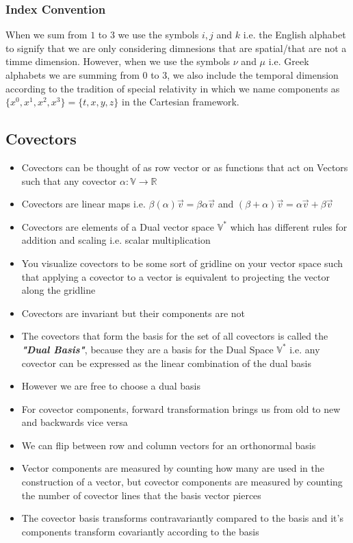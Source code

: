 \subsubsection{Index Convention}
When we sum from $1$ to $3$ we use the symbols $i,j$ and $k$ i.e. the English alphabet to signify that we are only considering dimnesions that are spatial/that are not a timme dimension. However, when we use the symbols $\nu$ and $\mu$ i.e. Greek alphabets we are summing from 0 to 3, we also include the temporal dimension according to the tradition of special relativity in which we name components as $\{x^{0}, x^{1}, x^{2}, x^{3}\} = \{t, x, y, z\}$ in the Cartesian framework.

\subsection{Covectors}
\begin{itemize}
	\item Covectors can be thought of as row vector or as functions that act on Vectors such that any covector $\alpha : \mathbb{V} \rightarrow \mathbb{R}$
	\item Covectors are linear maps i.e. $ \beta ( \alpha ) \vec{v} = \beta \alpha \vec{v}$ and $(\beta + \alpha ) \vec{v} = \alpha \vec{v} + \beta \vec{v}$
	\item Covectors are elements of a Dual vector space $\mathbb{V}^*$ which has different rules for addition and scaling i.e. scalar multiplication
	\item You visualize covectors to be some sort of gridline on your vector space such that applying a covector to a vector is equivalent to projecting the vector along the gridline
	\item Covectors are invariant but their components are not
	\item The covectors that form the basis for the set of all covectors is called the \textit{\textbf{"Dual Basis"}}, because they are a basis for the Dual Space $\mathbb{V}^*$ i.e. any covector can be expressed as the linear combination of the dual basis
	\item However we are free to choose a dual basis
	\item For covector components, forward transformation brings us from old to new and backwards vice versa
	\item We can flip between row and column vectors for an orthonormal basis
	\item Vector components are measured by counting how many are used in the construction of a vector, but covector components are measured by counting the number of covector lines that the basis vector pierces
	\item The covector basis transforms contravariantly compared to the basis and it's components transform covariantly according to the basis 
\end{itemize}


